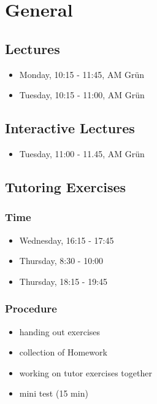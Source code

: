 \documentclass[
]{article}
\author{}
\date{}
\providecommand{\tightlist}{%
  \setlength{\itemsep}{0pt}\setlength{\parskip}{0pt}}
\begin{document}
\hypertarget{general}{%
\section{General}\label{general}}

\hypertarget{lectures}{%
\subsection{Lectures}\label{lectures}}

\begin{itemize}
\tightlist
\item
  Monday, 10:15 - 11:45, AM Grün
\item
  Tuesday, 10:15 - 11:00, AM Grün
\end{itemize}

\hypertarget{interactive-lectures}{%
\subsection{Interactive Lectures}\label{interactive-lectures}}

\begin{itemize}
\tightlist
\item
  Tuesday, 11:00 - 11.45, AM Grün
\end{itemize}

\hypertarget{tutoring-exercises}{%
\subsection{Tutoring Exercises}\label{tutoring-exercises}}

\hypertarget{time}{%
\subsubsection{Time}\label{time}}

\begin{itemize}
\tightlist
\item
  Wednesday, 16:15 - 17:45
\item
  Thursday, 8:30 - 10:00
\item
  Thursday, 18:15 - 19:45
\end{itemize}

\hypertarget{procedure}{%
\subsubsection{Procedure}\label{procedure}}

\begin{itemize}
\tightlist
\item
  handing out exercises
\item
  collection of Homework
\item
  working on tutor exercises together
\item
  mini test (15 min)
\end{itemize}
\end{document}
